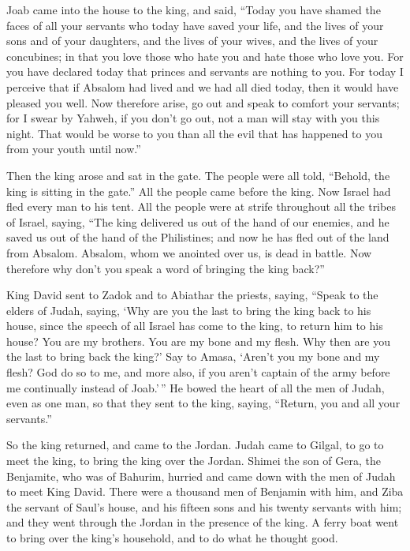  Joab came into the house to the king, and said, ``Today
you have shamed the faces of all your servants who today have saved your
life, and the lives of your sons and of your daughters, and the lives of
your wives, and the lives of your concubines;  in that you
love those who hate you and hate those who love you. For you have
declared today that princes and servants are nothing to you. For today I
perceive that if Absalom had lived and we had all died today, then it
would have pleased you well.  Now therefore arise, go out
and speak to comfort your servants; for I swear by Yahweh, if you don't
go out, not a man will stay with you this night. That would be worse to
you than all the evil that has happened to you from your youth until
now.''

 Then the king arose and sat in the gate. The people were
all told, ``Behold, the king is sitting in the gate.'' All the people
came before the king. Now Israel had fled every man to his tent.
 All the people were at strife throughout all the tribes
of Israel, saying, ``The king delivered us out of the hand of our
enemies, and he saved us out of the hand of the Philistines; and now he
has fled out of the land from Absalom.  Absalom, whom we
anointed over us, is dead in battle. Now therefore why don't you speak a
word of bringing the king back?''

 King David sent to Zadok and to Abiathar the priests,
saying, ``Speak to the elders of Judah, saying, `Why are you the last to
bring the king back to his house, since the speech of all Israel has
come to the king, to return him to his house?  You are my
brothers. You are my bone and my flesh. Why then are you the last to
bring back the king?'  Say to Amasa, `Aren't you my bone
and my flesh? God do so to me, and more also, if you aren't captain of
the army before me continually instead of Joab.'\,''  He
bowed the heart of all the men of Judah, even as one man, so that they
sent to the king, saying, ``Return, you and all your servants.''

 So the king returned, and came to the Jordan. Judah came
to Gilgal, to go to meet the king, to bring the king over the Jordan.
 Shimei the son of Gera, the Benjamite, who was of
Bahurim, hurried and came down with the men of Judah to meet King David.
 There were a thousand men of Benjamin with him, and Ziba
the servant of Saul's house, and his fifteen sons and his twenty
servants with him; and they went through the Jordan in the presence of
the king.  A ferry boat went to bring over the king's
household, and to do what he thought good.

